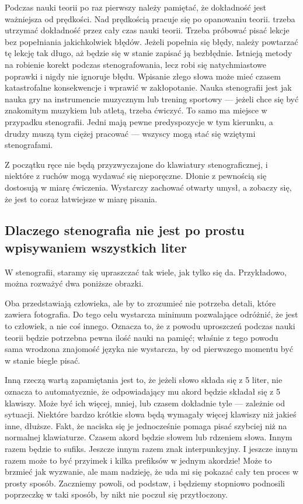 \documentclass[12p, oneside]{book}
\begin{document}
Podczas nauki teorii po raz pierwszy należy pamiętać, że dokładność jest ważniejsza od prędkości. Nad prędkością pracuje się po opanowaniu teorii. trzeba utrzymać dokładność przez cały czas nauki teorii. Trzeba próbować pisać lekcje bez popełniania jakichkolwiek błędów. Jeżeli popełnia się błędy, należy powtarzać tę lekcję tak długo, aż będzie się w stanie zapisać ją bezbłędnie. Istnieją metody na robienie korekt podczas stenografowania, lecz robi się natychmiastowe poprawki i nigdy nie ignoruje błędu. Wpisanie złego słowa może mieć czasem katastrofalne konsekwencje i wprawić w zakłopotanie. Nauka stenografii jest jak nauka gry na instrumencie muzycznym lub trening sportowy --- jeżeli chce się być znakomitym muzykiem lub atletą, trzeba ćwiczyć. To samo ma miejsce w przypadku stenografii. Jedni mają pewne predyspozycje w tym kierunku, a drudzy muszą tym ciężej pracować --- wszyscy mogą stać się wziętymi stenografami.

Z początku ręce nie będą przyzwyczajone do klawiatury stenograficznej, i niektóre z ruchów mogą wydawać się nieporęczne. Dłonie z pewnością się dostosują w miarę ćwiczenia. Wystarczy zachować otwarty umysł, a zobaczy się, że jest to coraz łatwiejsze w miarę pisania.

\subsection{Dlaczego stenografia nie jest po prostu wpisywaniem wszystkich liter}

W stenografii, staramy się upraszczać tak wiele, jak tylko się da. Przykładowo, można rozważyć dwa poniższe obrazki.

Oba przedstawiają człowieka, ale by to zrozumieć nie potrzeba detali, które zawiera fotografia. Do tego celu wystarcza minimum pozwalające odróżnić, że jest to człowiek, a nie coś innego. Oznacza to, że z powodu uproszczeń podczas nauki teorii będzie potrzebna pewna ilość nauki na pamięć; właśnie z tego powodu sama wrodzona znajomość języka nie wystarcza, by od pierwszego momentu być w stanie biegle pisać.

Inną rzeczą wartą zapamiętania jest to, że jeżeli słowo składa się z 5 liter, nie oznacza to automatycznie, że odpowiadający mu akord będzie składał się z 5 klawiszy. Może być ich więcej, mniej, lub czasem dokładnie tyle --- zależnie od sytuacji. Niektóre bardzo krótkie słowa będą wymagały więcej klawiszy niż jakieś inne, dłuższe. Fakt, że naciska się je jednocześnie pomaga pisać szybciej niż na normalnej klawiaturze. Czasem akord będzie słowem lub rdzeniem słowa. Innym razem będzie to sufiks. Jeszcze innym razem znak interpunkcyjny. I jeszcze innym razem może to być przyimek i kilka prefiksów w jednym akordzie! Może to brzmieć jak wyzwanie, ale mam nadzieję, że uda mi się pokazać cały ten proces w prosty sposób. Zaczniemy powoli, od podstaw, i będziemy stopniowo podnosili poprzeczkę w taki sposób, by nikt nie poczuł się przytłoczony.
\end{document}
